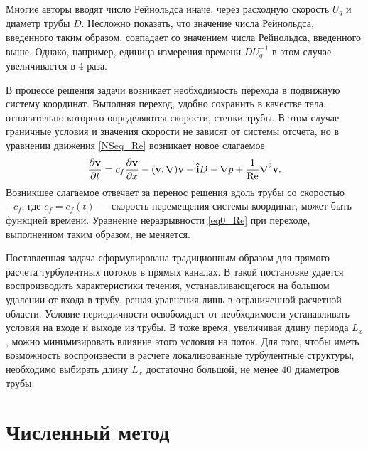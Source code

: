 Многие авторы вводят число Рейнольдса иначе, через расходную скорость $U_q$ и диаметр трубы $D$. Несложно показать, что значение числа Рейнольдса, введенного таким образом, совпадает со значением числа Рейнольдса, введенного выше. Однако, например, единица измерения времени $DU_q^{-1}$ в этом случае увеличивается в 4 раза.

В процессе решения задачи возникает необходимость перехода в подвижную систему координат. Выполняя переход, удобно сохранить в качестве тела, относительно которого определяются скорости, стенки трубы. В этом случае граничные условия и значения скорости не зависят от системы отсчета, но в уравнении движения \eqref{NSeq_Re} возникает новое слагаемое
\begin{equation}\label{NSeq_cf}
\frac{\partial \mathbf{v}}{\partial t} = c_f \frac{\partial \mathbf{v}}{\partial x} - (\mathbf{v}, \nabla) \mathbf{v} - \mathbf{\hat{i}} D - \nabla p + \frac{1}{\operatorname{Re}} \nabla^2 \mathbf{v}. 
\end{equation}
Возникшее слагаемое отвечает за перенос решения вдоль трубы со скоростью $-c_f$, где $c_f = c_f(t)$ --- скорость перемещения системы координат, может быть функцией времени. Уравнение неразрывности \eqref{eq0_Re} при переходе, выполненном таким образом, не меняется. 


Поставленная задача сформулирована традиционным образом для прямого расчета турбулентных потоков в прямых каналах. В такой постановке удается воспроизводить характеристики течения, устанавливающегося на большом удалении от входа в трубу, решая уравнения лишь в ограниченной расчетной области. Условие периодичности освобождает от необходимости устанавливать условия на входе и выходе из трубы. В тоже время, увеличивая длину периода $L_x$, можно минимизировать влияние этого условия на поток. Для того, чтобы иметь возможность воспроизвести в расчете локализованные турбулентные структуры, необходимо выбирать длину $L_x$ достаточно большой, не менее $40$ диаметров трубы. 


\section{Численный метод}

\begin{comment}
Поставленная задача решается численно конечно-разностным методом \cite{nikitin2006method}. Метод формулируется относительно уравнения движения \eqref{NSeq_Re}, преобразованного к виду 
\begin{equation}\label{NSeq_om}
\pd{\v}{t} = - \i D + \v \times \om - \nabla P - \frac{1}{\Re} \rot \om
\end{equation}
Здесь $\om = \rot \v$ --- вектор завихренности, посчитанный по полю скорости $\v$, $P = p + |\v|^2/2$ --- полное кинематическое давление. Эквивалентность уравнений \eqref{NSeq_Re} и \eqref{NSeq_om} следует из векторных тождеств
\begin{equation*}
-(\v, \nabla) \v = \v \times \rot \v - \nabla |\v|^2/2,
\end{equation*}
\begin{equation*}
\nabla^2 \v = \grad \div \v - \rot \rot \v.
\end{equation*}
\end{comment}

